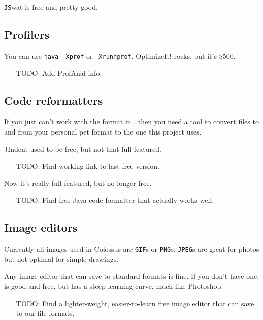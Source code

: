 \documentclass{article}
\begin{document}
\texttt{JS}wat is free and pretty good.

\subsection{Profilers}

You can use \texttt{java -Xprof} or \texttt{-Xrunhprof}.
OptimizeIt! rocks, but it's \$500.
\begin{itemize}
\item[TODO:] Add ProfAnal info.
\end{itemize}

\subsection{Code reformatters}

If you just can't work with the format in
,
then you need a tool to convert files to and from your personal pet
format to the one this project uses.

JIndent used to be free, but not that full-featured. 
\begin{itemize}
\item[TODO:] Find working link to last free version.
\end{itemize}
Now it's really full-featured, but no longer free.
\begin{itemize}
\item[TODO:] Find free Java code formatter that actually works well.
\end{itemize}

\subsection{Image editors}

Currently all images used in Colossus are \texttt{GIF}s or \texttt{PNG}s.
\texttt{JPEG}s are great for photos but not optimal for simple drawings.

Any image editor that can save to standard formats is fine. If you
don't have one,  is good and free,
but has a steep learning curve, much like Photoshop. 
\begin{itemize}
\item[TODO:] Find a lighter-weight, easier-to-learn free image editor that 
can save to our file formats.
\end{itemize}
\end{document}
